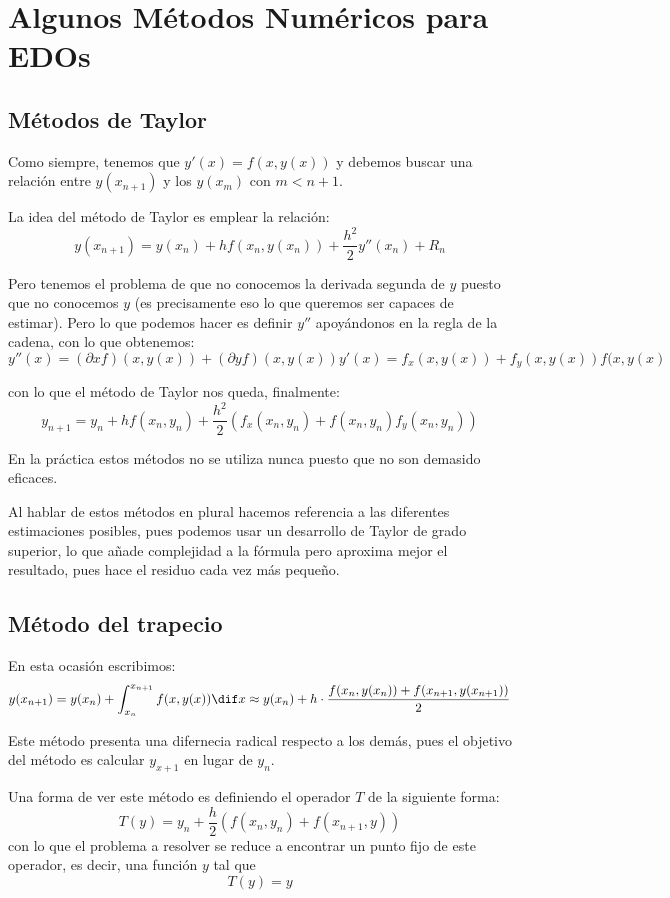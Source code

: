 
\chapter{Algunos Métodos Numéricos para EDOs}


\section{Métodos de Taylor}
Como siempre, tenemos que $y'(x)=f(x,y(x))$ y debemos buscar una relación entre $y(x_{n+1})$ y los $y(x_m)$ con $m < n+1$.

La idea del método de Taylor es emplear la relación:
\[y(x_{n+1})=y(x_n)+hf(x_n,y(x_n))+\frac{h^2}{2}y''(x_n)+R_n\]

Pero tenemos el problema de que no conocemos la derivada segunda de $y$ puesto que no conocemos $y$ (es precisamente eso lo que queremos ser capaces de estimar). Pero lo que podemos hacer es definir $y''$ apoyándonos en la regla de la cadena, con lo que obtenemos:
\[y''(x)=(\partial x f)(x,y(x))+(\partial y f)(x,y(x))y'(x)=f_x(x,y(x))+f_y(x,y(x))f(x,y(x)\]

con lo que el método de Taylor nos queda, finalmente:
\[y_{n+1} = y_n + hf(x_n,y_n)+\frac{h^2}{2}\left(f_x(x_n,y_n)+f(x_n, y_n)f_y(x_n,y_n)\right)\]

\begin{remark}
En la práctica estos métodos no se utiliza nunca puesto que no son demasido eficaces.
\end{remark}

Al hablar de estos métodos en plural hacemos referencia a las diferentes estimaciones posibles, pues podemos usar un desarrollo de Taylor de grado superior, lo que añade complejidad a la fórmula pero aproxima mejor el resultado, pues hace el residuo cada vez más pequeño.


\section{Método del trapecio}
En esta ocasión escribimos:
\[y(x_{n+1})=y(x_n) + \int_{x_n}^{x_{n+1}} f(x,y(x))\dif x \approx y(x_n)+ h\cdot \frac{f(x_n,y(x_n))+f(x_{n+1},y(x_{n+1}))}{2}  \]

Este método presenta una difernecia radical respecto a los demás, pues el objetivo del método es calcular $y_{x+1}$ en lugar de $y_n$.

Una forma de ver este método es definiendo el operador $T$ de la siguiente forma:
\[T(y) = y_n + \frac{h}{2} \left(f(x_n,y_n)+f(x_{n+1}, y) \right)\]
con lo que el problema a resolver se reduce a encontrar un punto fijo de este operador, es decir, una función $y$ tal que
\[T(y)=y\]

